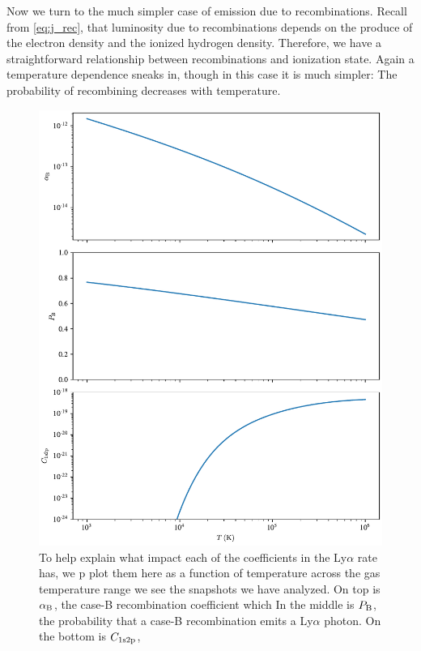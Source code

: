 Now we turn to the much simpler case of emission due to recombinations.
Recall from \ref{eq:j_rec}, that luminosity due to recombinations depends on the produce of the electron density and the ionized hydrogen density.
Therefore, we have a straightforward relationship between recombinations and ionization state.
Again a temperature dependence sneaks in, though in this case it is much simpler: The probability of recombining decreases with temperature.
\begin{figure}
  \centering
    \includegraphics[width=\textwidth,height=\textheight,keepaspectratio]{figures/coefficients.pdf}
  \caption{
      To help explain what impact each of the coefficients in the Ly$\alpha$ rate has, we p plot them here as a function of temperature across the gas temperature range we see the snapshots we have analyzed.
      On top is $\alpha_{\rm{B}}$, the case-B recombination coefficient which
      In the middle is $P_{\rm{B}}$, the probability that a case-B recombination emits a Ly$\alpha$ photon.
      On the bottom is $C_{\rm{1s2p}}$, 
  }
  \label{fig:coefficients}
\end{figure}

